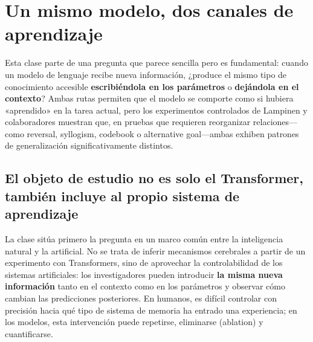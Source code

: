 \section{Un mismo modelo, dos canales de aprendizaje}

Esta clase parte de una pregunta que parece sencilla pero es fundamental: cuando un modelo de lenguaje recibe nueva información, ¿produce el mismo tipo de conocimiento accesible \textbf{escribiéndola en los parámetros} o \textbf{dejándola en el contexto}? Ambas rutas permiten que el modelo se comporte como si hubiera «aprendido» en la tarea actual, pero los experimentos controlados de Lampinen y colaboradores muestran que, en pruebas que requieren reorganizar relaciones—como reversal, syllogism, codebook o alternative goal—ambas exhiben patrones de generalización significativamente distintos.

\subsection{El objeto de estudio no es solo el Transformer, también incluye al propio sistema de aprendizaje}

La clase sitúa primero la pregunta en un marco común entre la inteligencia natural y la artificial. No se trata de inferir mecanismos cerebrales a partir de un experimento con Transformers, sino de aprovechar la controlabilidad de los sistemas artificiales: los investigadores pueden introducir \textbf{la misma nueva información} tanto en el contexto como en los parámetros y observar cómo cambian las predicciones posteriores. En humanos, es difícil controlar con precisión hacia qué tipo de sistema de memoria ha entrado una experiencia; en los modelos, esta intervención puede repetirse, eliminarse (ablation) y cuantificarse.



